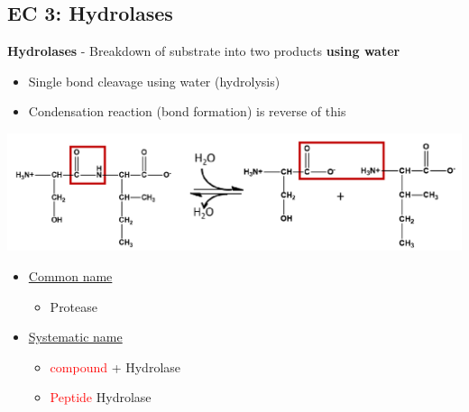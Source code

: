 \documentclass[10pt]{article}
\begin{document}
\subsection*{EC 3: Hydrolases}
\textbf{Hydrolases} - Breakdown of substrate into two products \textbf{using water}
\begin{itemize}
    \item Single bond cleavage using water (hydrolysis)
    \item Condensation reaction (bond formation) is reverse of this
\end{itemize}
\begin{center}
    \includegraphics*[width=\textwidth]{L2_5.png} 
\end{center}
\begin{itemize}
    \item \underline{Common name}
    \begin{itemize}
        \item Protease
    \end{itemize}
    \item \underline{Systematic name}
    \begin{itemize}
        \item \textcolor{red}{compound} + Hydrolase
        \item \textcolor{red}{Peptide} Hydrolase
    \end{itemize}
\end{itemize}
\end{document}
